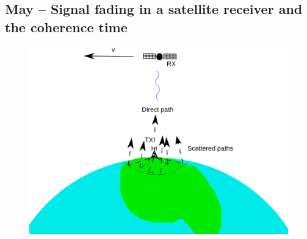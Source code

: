 \documentclass{article}
\begin{document}
\subsection{May –  Signal fading in a satellite receiver and the coherence time}
\begin{figure}
  \includegraphics[width=\linewidth]{satelliteinterference.png}
\end{figure}
\end{document}
